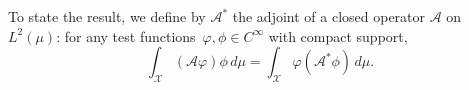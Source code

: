 To state the result, we define by $\mathcal{A}^*$ the adjoint of a closed operator $\mathcal{A}$ on $L^2(\mu)$: for any test functions~$\varphi, \phi \in C^\infty$ with compact support,
%
\begin{equation}
    \int_\mathcal{X} (\mathcal{A}\varphi)\phi \, d\mu = \int_\mathcal{X} \varphi(\mathcal{A}^*\phi) \, d\mu.
    \label{eq:Astar_adjoint}
\end{equation}
%
%


